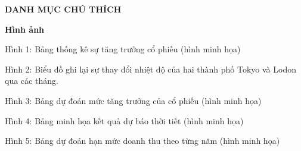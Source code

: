 
\newpage
\changefontsizes{16pt}
\centerline{\textbf{DANH MỤC CHÚ THÍCH}}


\vspace{1cm}
\changefontsizes{14pt}
\setlength{\parindent}{0cm}
\bigskip
\textbf{Hình ảnh}

\smallskip
\setlength{\parindent}{1cm}
\changefontsizes{13pt}
Hình 1: Bảng thống kê sự tăng trưởng cổ phiếu (hình minh họa)

\smallskip
Hình 2: Biểu đồ ghi lại sự thay đổi nhiệt độ của hai thành phố Tokyo và Lodon qua các tháng.


\smallskip
Hình 3: Bảng dự đoán mức tăng trưởng của cổ phiếu (hình minh họa)

\smallskip
Hình 4: Bảng minh họa kết quả dự báo thời tiết (hình minh họa)

\smallskip
Hình 5: Bảng dự đoán hạn mức doanh thu theo từng năm (hình minh họa)
